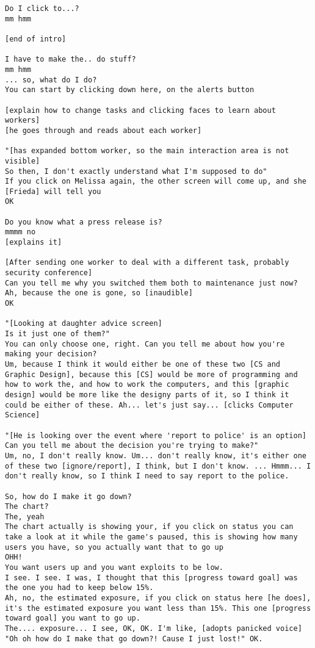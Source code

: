 \begin{lstlisting}
Do I click to...?
mm hmm

[end of intro]

I have to make the.. do stuff?
mm hmm
... so, what do I do?
You can start by clicking down here, on the alerts button

[explain how to change tasks and clicking faces to learn about workers]
[he goes through and reads about each worker]

"[has expanded bottom worker, so the main interaction area is not visible]
So then, I don't exactly understand what I'm supposed to do"
If you click on Melissa again, the other screen will come up, and she [Frieda] will tell you
OK

Do you know what a press release is?
mmmm no
[explains it]

[After sending one worker to deal with a different task, probably security conference]
Can you tell me why you switched them both to maintenance just now?
Ah, because the one is gone, so [inaudible]
OK

"[Looking at daughter advice screen]
Is it just one of them?"
You can only choose one, right. Can you tell me about how you're making your decision?
Um, because I think it would either be one of these two [CS and Graphic Design], because this [CS] would be more of programming and how to work the, and how to work the computers, and this [graphic design] would be more like the designy parts of it, so I think it could be either of these. Ah... let's just say... [clicks Computer Science]

"[He is looking over the event where 'report to police' is an option]
Can you tell me about the decision you're trying to make?"
Um, no, I don't really know. Um... don't really know, it's either one of these two [ignore/report], I think, but I don't know. ... Hmmm... I don't really know, so I think I need to say report to the police. 

So, how do I make it go down?
The chart?
The, yeah
The chart actually is showing your, if you click on status you can take a look at it while the game's paused, this is showing how many users you have, so you actually want that to go up
OHH!
You want users up and you want exploits to be low.
I see. I see. I was, I thought that this [progress toward goal] was the one you had to keep below 15%.
Ah, no, the estimated exposure, if you click on status here [he does], it's the estimated exposure you want less than 15%. This one [progress toward goal] you want to go up.
The.... exposure... I see, OK, OK. I'm like, [adopts panicked voice] "Oh oh how do I make that go down?! Cause I just lost!" OK.


\end{lstlisting}
